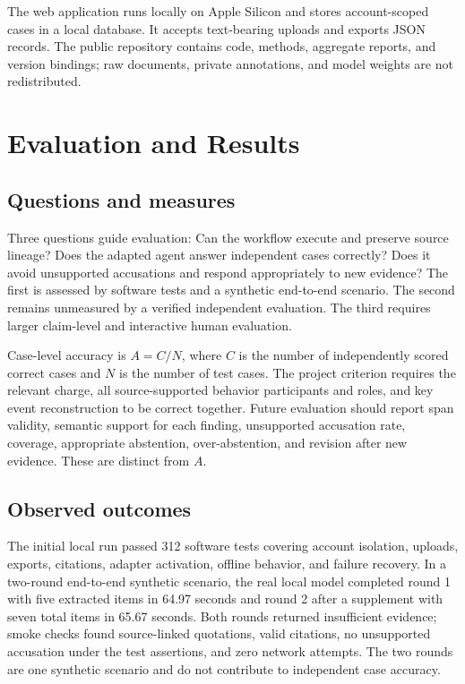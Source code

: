 \documentclass[10pt,a4paper]{article}
\begin{document}
The web application runs locally on Apple Silicon and stores account-scoped cases in a local database. It accepts text-bearing uploads and exports JSON records. The public repository \cite{repository} contains code, methods, aggregate reports, and version bindings; raw documents, private annotations, and model weights are not redistributed.

\section{Evaluation and Results}
\subsection{Questions and measures}
Three questions guide evaluation: Can the workflow execute and preserve source lineage? Does the adapted agent answer independent cases correctly? Does it avoid unsupported accusations and respond appropriately to new evidence? The first is assessed by software tests and a synthetic end-to-end scenario. The second remains unmeasured by a verified independent evaluation. The third requires larger claim-level and interactive human evaluation.

Case-level accuracy is $A=C/N$, where $C$ is the number of independently scored correct cases and $N$ is the number of test cases. The project criterion requires the relevant charge, all source-supported behavior participants and roles, and key event reconstruction to be correct together. Future evaluation should report span validity, semantic support for each finding, unsupported accusation rate, coverage, appropriate abstention, over-abstention, and revision after new evidence. These are distinct from $A$.

\subsection{Observed outcomes}
The initial local run passed 312 software tests covering account isolation, uploads, exports, citations, adapter activation, offline behavior, and failure recovery. In a two-round end-to-end synthetic scenario, the real local model completed round 1 with five extracted items in 64.97 seconds and round 2 after a supplement with seven total items in 65.67 seconds. Both rounds returned insufficient evidence; smoke checks found source-linked quotations, valid citations, no unsupported accusation under the test assertions, and zero network attempts. The two rounds are one synthetic scenario and do not contribute to independent case accuracy.
\end{document}
